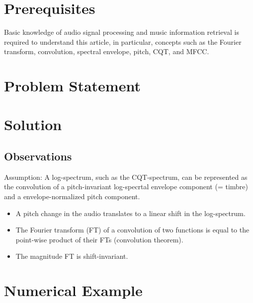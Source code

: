 \documentclass[journal]{IEEEtran}
\begin{document}
\section{Prerequisites}

Basic knowledge of audio signal processing and music information retrieval is required to understand this article, in particular, concepts such as the Fourier transform, convolution, spectral envelope, pitch, CQT, and MFCC.


\section{Problem Statement}

% 





\section{Solution}

\subsection{Observations}

Assumption: A log-spectrum, such as the CQT-spectrum, can be represented as the convolution of a pitch-invariant log-specrtal envelope component (= timbre) and a envelope-normalized pitch component.

\begin{itemize}
\item A pitch change in the audio translates to a linear shift in the log-spectrum.
\item The Fourier transform (FT) of a convolution of two functions is equal to the point-wise product of their FTs (convolution theorem).
\item The magnitude FT is shift-invariant.
\end{itemize}




\section{Numerical Example}

%
\end{document}
